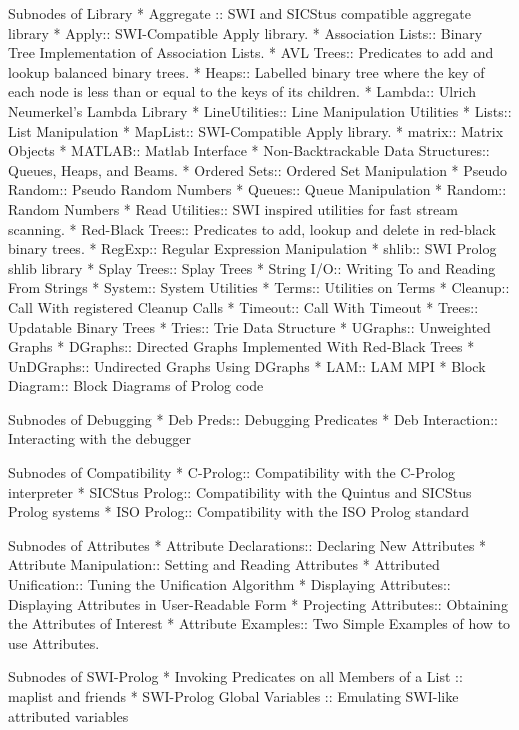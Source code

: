 Subnodes of Library
* Aggregate :: SWI and SICStus compatible aggregate library
* Apply:: SWI-Compatible Apply library.
* Association Lists:: Binary Tree Implementation of Association Lists.
* AVL Trees:: Predicates to add and lookup balanced binary  trees.
* Heaps:: Labelled binary tree where the key of each node is less
    than or equal to the keys of its children.
* Lambda:: Ulrich Neumerkel's Lambda Library
* LineUtilities:: Line Manipulation Utilities
* Lists:: List Manipulation
* MapList:: SWI-Compatible Apply library.
* matrix:: Matrix Objects
* MATLAB:: Matlab Interface
* Non-Backtrackable Data Structures:: Queues, Heaps, and Beams.
* Ordered Sets:: Ordered Set Manipulation
* Pseudo Random:: Pseudo Random Numbers
* Queues:: Queue Manipulation
* Random:: Random Numbers
* Read Utilities:: SWI inspired utilities for fast stream scanning.
* Red-Black Trees:: Predicates to add, lookup and delete in red-black binary  trees.
* RegExp:: Regular Expression Manipulation
* shlib:: SWI Prolog shlib library
* Splay Trees:: Splay Trees
* String I/O:: Writing To and Reading From Strings
* System:: System Utilities
* Terms:: Utilities on Terms
* Cleanup:: Call With registered Cleanup Calls
* Timeout:: Call With Timeout
* Trees:: Updatable Binary Trees
* Tries:: Trie Data Structure
* UGraphs:: Unweighted Graphs
* DGraphs:: Directed Graphs Implemented With Red-Black Trees
* UnDGraphs:: Undirected Graphs Using DGraphs
* LAM:: LAM MPI
* Block Diagram:: Block Diagrams of Prolog code


Subnodes of Debugging
* Deb Preds:: Debugging Predicates
* Deb Interaction:: Interacting with the debugger

Subnodes of Compatibility
* C-Prolog:: Compatibility with the C-Prolog interpreter
* SICStus Prolog:: Compatibility with the Quintus and SICStus Prolog systems
* ISO Prolog::  Compatibility with the ISO Prolog standard

Subnodes of Attributes
* Attribute Declarations:: Declaring New Attributes
* Attribute Manipulation:: Setting and Reading Attributes
* Attributed Unification:: Tuning the Unification Algorithm
* Displaying Attributes:: Displaying Attributes in User-Readable Form
* Projecting Attributes:: Obtaining the Attributes of Interest
* Attribute Examples:: Two Simple Examples of how to use Attributes.

Subnodes of SWI-Prolog
* Invoking Predicates on all Members of a List :: maplist and friends
* SWI-Prolog Global Variables :: Emulating SWI-like attributed variables

